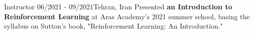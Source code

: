 \resumeSubheadingReza
{Instructor}{}
{06/2021 - 09/2021}{Tehran, Iran}
{Presented \textbf{an Introduction to Reinforcement Learning} at Aras Academy's 2021 summer school, basing the syllabus on Sutton's book, "Reinforcement Learning: An Introduction."}
